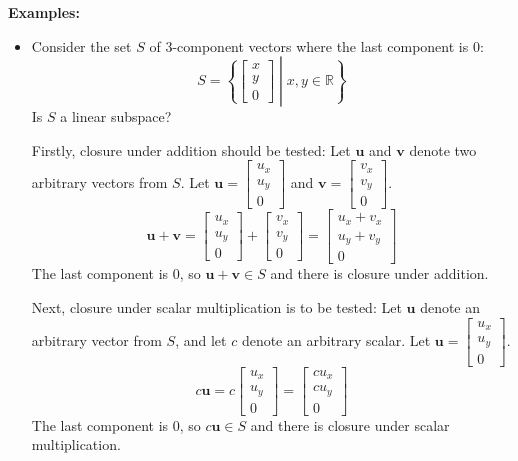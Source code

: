 \documentclass{article}
\begin{document}
\textbf{Examples:}
\begin{itemize}
\item Consider the set \(S\) of \(3\)-component vectors where the last component is \(0\):
\[S = \left\{\begin{bmatrix} x \\ y \\ 0 \end{bmatrix}\middle| x, y \in \mathbb{R} \right\}\]
Is \(S\) a linear subspace? 

Firstly, closure under addition should be tested:
Let \(\mathbf{u}\) and \(\mathbf{v}\) denote two arbitrary vectors from \(S\). Let \(\mathbf{u} = \begin{bmatrix} u_x \\ u_y \\ 0 \end{bmatrix}\) and \(\mathbf{v} = \begin{bmatrix} v_x \\ v_y \\ 0 \end{bmatrix}\).
\[\mathbf{u} + \mathbf{v} = \begin{bmatrix} u_x \\ u_y \\ 0 \end{bmatrix} + \begin{bmatrix} v_x \\ v_y \\ 0 \end{bmatrix} = \begin{bmatrix} u_x + v_x \\ u_y + v_y \\ 0 \end{bmatrix}\]
The last component is \(0\), so \(\mathbf{u} + \mathbf{v} \in S\) and there is closure under addition. 

Next, closure under scalar multiplication is to be tested:
Let \(\mathbf{u}\) denote an arbitrary vector from \(S\), and let \(c\) denote an arbitrary scalar. Let \(\mathbf{u} = \begin{bmatrix} u_x \\ u_y \\ 0 \end{bmatrix}\). 
\[c\mathbf{u} = c\begin{bmatrix} u_x \\ u_y \\ 0 \end{bmatrix} = \begin{bmatrix} c u_x \\ c u_y \\ 0 \end{bmatrix}\] 
The last component is \(0\), so \(c \mathbf{u} \in S\) and there is closure under scalar multiplication. 


\end{itemize}
\end{document}
